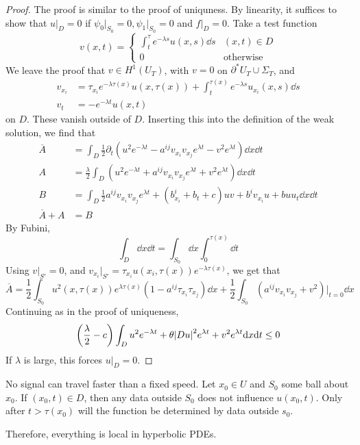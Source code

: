 \documentclass{article}
\begin{document}
\begin{proof}
    The proof is similar to the proof of uniquness. By linearity, it suffices to show that \(u\vert_D = 0\) if \(\psi_0\vert_{S_0} = 0, \psi_1\vert_{S_0} = 0\) and \(f\vert_D = 0\). Take a test function
    \[v(x, t) = \begin{cases}
        \int_t^\tau  e^{-\lambda s} u(x, s)\dd s & (x, t) \in D \\
        0 & \text{otherwise}
    \end{cases}\]
    We leave the proof that \(v \in H^1(U_T)\), with \(v = 0\) on \(\partial^*U_T \cup \Sigma_T\), and
    \begin{align*}
        v_{x_i} &= \tau_{x_i}e^{-\lambda\tau(x)}u(x, \tau(x)) + \int_t^{\tau(x)}e^{-\lambda s}u_{x_i}(x, s)\dd s \\
        v_t &= -e^{-\lambda t}u(x, t)
    \end{align*} 
    on \(D\). These vanish outside of \(D\). Inserting this into the definition of the weak solution, we find that
    \begin{align*}
        \overline{A} &= 
        \int_D \frac{1}{2}\partial_t\left(u^2e^{-\lambda t} - a^{ij}v_{x_i}v_{x_j}e^{\lambda t} - v^2 e^{\lambda t}\right)\dd x \dd t \\
        A &= \frac{\lambda}{2}\int_D(u^2e^{-\lambda t} + a^{ij}v_{x_i}v_{x_j}e^{\lambda t} + v^2e^{\lambda t})\dd x \dd t \\
        B &= \int_D \frac12 a^{ij}v_{x_i}v_{x_j}e^{\lambda t} + (b^i_{x_i} + b_t + c)uv + b^iv_{x_i}u + buu_t \dd x \dd t \\
        \overline{A} + A &= B
    \end{align*}
    By Fubini,
    \[\int_D \dd x\dd t = \int_{S_0}\dd x\int_0^{\tau(x)}\dd t\]
    Using \(v\vert_{S'} = 0\), and \(v_{x_i}\vert_{S'} = \tau_{x_i}u(x_i, \tau(x))e^{-\lambda\tau(x)}\), we get that
    \[\overline{A} = \frac{1}{2}\int_{S_0}u^2(x, \tau(x)) e^{\lambda \tau(x)}(1 - a^{ij}\tau_{x_i}\tau_{x_j})\dd x + \frac{1}{2}\int_{S_0}(a^{ij}v_{x_i}v_{x_j} + v^2)\vert_{t=0}\dd x\]
    Continuing as in the proof of uniqueness,
    \[\left(\frac{\lambda}{2} - c\right)\int_D u^2e^{-\lambda t} + \theta\abs{Du}^2e^{\lambda t} + v^2e^{\lambda t}\dd x \dd t \le 0\]
    If \(\lambda\) is large, this forces \(u\vert_D = 0\).
\end{proof}

\begin{remark}
    No signal can travel faster than a fixed speed. Let \(x_0 \in U\) and \(S_0\) some ball about \(x_0\). If \((x_0, t) \in D\), then any data outside \(S_0\) does not influence \(u(x_0, t)\). Only after \(t > \tau(x_0)\) will the function be determined by data outside \(s_0\).

    Therefore, everything is local in hyperbolic PDEs.
\end{remark}
\end{document}
